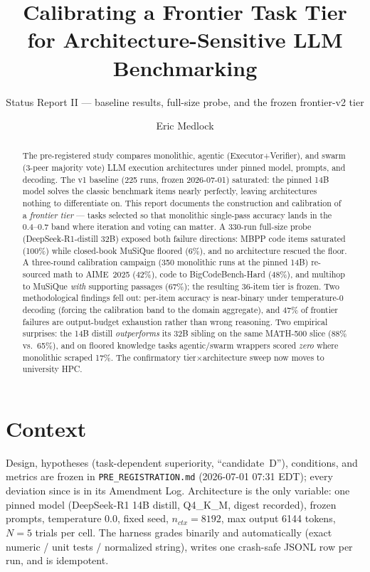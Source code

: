 \documentclass[sigconf,nonacm]{acmart}
\begin{document}
\title{Calibrating a Frontier Task Tier for Architecture-Sensitive LLM Benchmarking}
\subtitle{Status Report II --- baseline results, full-size probe, and the frozen frontier-v2 tier}

\author{Eric Medlock}

\begin{abstract}
The pre-registered study compares monolithic, agentic (Executor+Verifier), and swarm
(3-peer majority vote) LLM execution architectures under pinned model, prompts, and
decoding. The v1 baseline (225 runs, frozen 2026-07-01) saturated: the pinned 14B model
solves the classic benchmark items nearly perfectly, leaving architectures nothing to
differentiate on. This report documents the construction and calibration of a
\emph{frontier tier} --- tasks selected so that monolithic single-pass accuracy lands in
the 0.4--0.7 band where iteration and voting can matter. A 330-run full-size probe
(DeepSeek-R1-distill 32B) exposed both failure directions: MBPP code items saturated
(100\%) while closed-book MuSiQue floored (6\%), and no architecture rescued the floor.
A three-round calibration campaign (350 monolithic runs at the pinned 14B) re-sourced
math to AIME~2025 (42\%), code to BigCodeBench-Hard (48\%), and multihop to MuSiQue
\emph{with} supporting passages (67\%); the resulting 36-item tier is frozen. Two
methodological findings fell out: per-item accuracy is near-binary under temperature-0
decoding (forcing the calibration band to the domain aggregate), and 47\% of frontier
failures are output-budget exhaustion rather than wrong reasoning. Two empirical
surprises: the 14B distill \emph{outperforms} its 32B sibling on the same MATH-500 slice
(88\% vs.\ 65\%), and on floored knowledge tasks agentic/swarm wrappers scored
\emph{zero} where monolithic scraped 17\%. The confirmatory tier$\times$architecture
sweep now moves to university HPC.
\end{abstract}

\maketitle

\section{Context}
Design, hypotheses (task-dependent superiority, ``candidate~D''), conditions, and
metrics are frozen in \texttt{PRE\_REGISTRATION.md} (2026-07-01 07:31 EDT); every
deviation since is in its Amendment Log. Architecture is the only variable: one pinned
model (DeepSeek-R1 14B distill, Q4\_K\_M, digest recorded), frozen prompts, temperature
0.0, fixed seed, $n_{ctx}=8192$, max output 6144 tokens, $N=5$ trials per cell. The
harness grades binarily and automatically (exact numeric / unit tests / normalized
string), writes one crash-safe JSONL row per run, and is idempotent.
\end{document}
